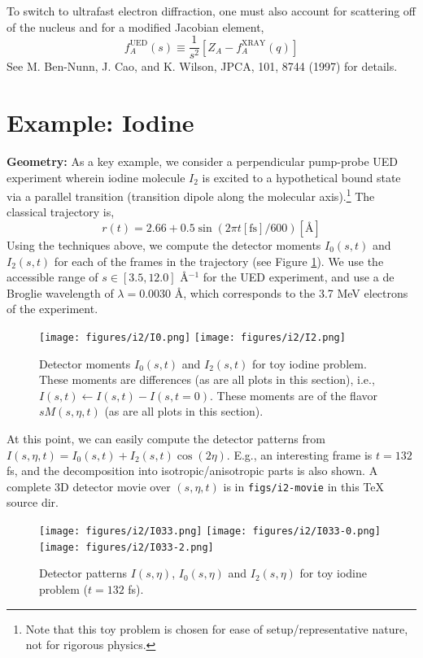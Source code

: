 \documentclass[fleqn,oneside,12pt]{article}
\begin{document}
To switch to ultrafast electron diffraction, one must also account for
scattering off of the nucleus and for a modified Jacobian element,
\[
f_{A}^{\mathrm{UED}}
(s)
\equiv
\frac{1}{s^2}
\left [
Z_{A}
-
f_{A}^{\mathrm{XRAY}}
(q)
\right ]
\]
See M. Ben-Nunn, J. Cao, and K. Wilson, JPCA, 101, 8744 (1997) for details.

\section{Example: Iodine}

\textbf{Geometry:} As a key example, we consider a perpendicular pump-probe UED
experiment wherein iodine molecule $I_{2}$ is excited to a hypothetical bound
state via a parallel transition (transition dipole along the molecular
axis).\footnote{Note that this toy problem is chosen for ease of
setup/representative nature, not for rigorous physics.} The classical trajectory
is,
\[
r (t)
=
2.66
+
0.5 \sin (2 \pi t [\mbox{fs}]/ 600)
[ \mbox{\AA{}} ]
\]
Using the techniques above, we compute the detector moments $I_0 (s, t)$ and
$I_2 (s, t)$ for each of the frames in the trajectory (see Figure
\ref{fig:I02}). We use the accessible range of $s \in [3.5, 12.0]$ \AA{}$^{-1}$
for the UED experiment, and use a de Broglie wavelength of $\lambda = 0.0030$
\AA{}, which corresponds to the 3.7 MeV electrons of the experiment.

\begin{figure}[h!]
\begin{center}
\texttt{[image: figures/i2/I0.png]}
\texttt{[image: figures/i2/I2.png]}
\caption{Detector moments $I_{0} (s, t)$ and $I_{2} (s, t)$ for toy iodine
problem. These moments are differences (as are all plots in this section), i.e.,
$I (s, t) \leftarrow I(s, t) - I(s, t=0)$. These moments are of the flavor $s
M(s, \eta, t)$ (as are all plots in this section).}
\label{fig:I02}
\end{center}
\end{figure}

At this point, we can easily compute the detector patterns from $I(s, \eta, t) =
I_{0} (s, t) + I_{2} (s, t) \cos(2 \eta)$. E.g., an interesting frame is $t=132$
fs, and the decomposition into isotropic/anisotropic parts is also shown. A
complete 3D detector movie over $(s, \eta, t)$ is in \texttt{figs/i2-movie} in
this TeX source dir.

\begin{figure}[h!]
\begin{center}
\texttt{[image: figures/i2/I033.png]}
\texttt{[image: figures/i2/I033-0.png]}
\texttt{[image: figures/i2/I033-2.png]}
\caption{Detector patterns $I (s, \eta)$, $I_{0} (s, \eta)$ and $I_{2} (s,
\eta)$ for toy iodine problem ($t = 132$ fs).}
\label{fig:Idet}
\end{center}
\end{figure}
\end{document}
